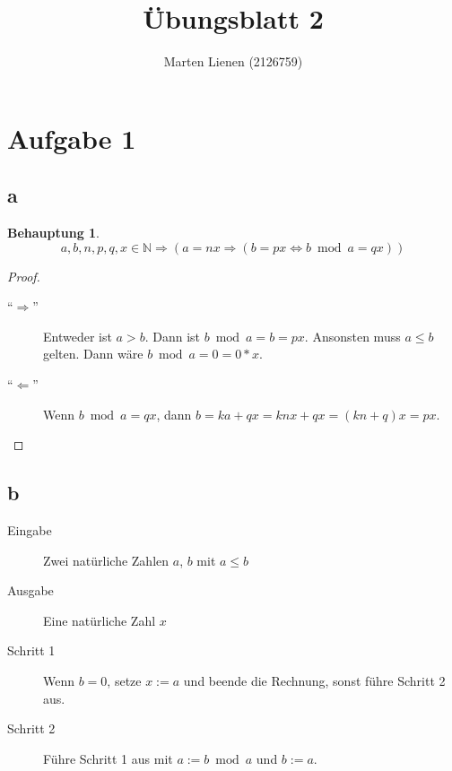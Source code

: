 \documentclass[a4paper,10pt]{article}
\title{Übungsblatt 2}
\author{Marten Lienen (2126759)}
\newtheorem*{claim}{Behauptung}
\begin{document}
\maketitle

\section*{Aufgabe 1}

\subsection*{a}

\begin{claim}
 \begin{equation*}
  a, b, n, p , q, x \in \mathbb{N} \Rightarrow (a = nx \Rightarrow (b = px \Leftrightarrow b \bmod a = qx))
 \end{equation*}
\end{claim}

\begin{proof}
 \begin{description}
  \item[``$\Rightarrow$'']
  Entweder ist $a > b$. Dann ist $b \bmod a = b = px$.
  Ansonsten muss $a \le b$ gelten.
  Dann wäre $b \bmod a = 0 = 0 * x$.
  
  \item[``$\Leftarrow$'']
  Wenn $b \bmod a = qx$, dann $b = ka + qx = knx + qx = (kn + q)x = px$.
 \end{description}
\end{proof}

\subsection*{b}

\begin{description}
 \item[Eingabe] Zwei natürliche Zahlen $a$, $b$ mit $a \le b$
 \item[Ausgabe] Eine natürliche Zahl $x$
\end{description}

\begin{description}
 \item[Schritt 1] Wenn $b = 0$, setze $x := a$ und beende die Rechnung, sonst führe Schritt 2 aus.
 \item[Schritt 2] Führe Schritt 1 aus mit $a := b \bmod a$ und $b := a$.
\end{description}
\end{document}

